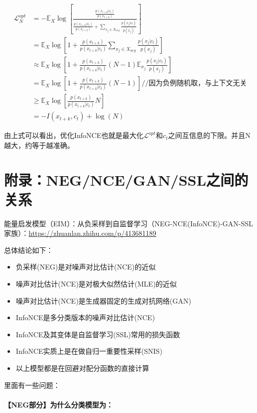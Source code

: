 \documentclass{article}
\begin{document}
\begin{equation}
    \begin{split}
        \mathcal{L}_N^{opt} &= - \mathbb{E}_{X} \log [\frac{\frac{p(x_{t+k}|c_t)}{p(x_{t+k})}}{\frac{p(x_{t+k}|c_t)}{p(x_{t+k})} + \sum_{x_j \in X_{neg}} \frac{p(x_j|c_t)}{p(x_j)} }] \\
        &= \mathbb{E}_{X} \log [1+ \frac{p(x_{t+k})}{p(x_{t+k}|c_t)} \sum_{x_j \in X_{neg}} \frac{p(x_j|c_t)}{p(x_j)}] \\
        &\approx \mathbb{E}_X \log [1+ \frac{p(x_{t+k})}{p(x_{t+k}|c_t)} (N-1) \mathbb{E}_{x_j}\frac{p(x_j|c_t)}{p(x_j)}] \\
        &=  \mathbb{E}_X \log [1+ \frac{p(x_{t+k})}{p(x_{t+k}|c_t)} (N-1)] // \textbf{因为负例随机取，与上下文无关}\\
        &\ge \mathbb{E}_X \log [\frac{p(x_{t+k})}{p(x_{t+k}|c_t)} N]\\
        &= -I(x_{t+k},c_t)+ \log(N)
    \end{split}
\end{equation}

由上式可以看出，优化InfoNCE也就是最大化$\mathcal{L}^{opt}$和$c_t$之间互信息的下限。并且N越大，约等于越准确。

\section{附录：NEG/NCE/GAN/SSL之间的关系}

能量启发模型（EIM）：从负采样到自监督学习（NEG-NCE(InfoNCE)-GAN-SSL 家族）：\url{https://zhuanlan.zhihu.com/p/413681189}


总体结论如下：
\begin{itemize}
    \item 负采样(NEG)是对噪声对比估计(NCE)的近似
    \item 噪声对比估计(NCE)是对极大似然估计(MLE)的近似
    \item 噪声对比估计(NCE)是生成器固定的生成对抗网络(GAN)
    \item InfoNCE是多分类版本的噪声对比估计(NCE)
    \item InfoNCE及其变体是自监督学习(SSL)常用的损失函数
    \item InfoNCE实质上是在做自归一重要性采样(SNIS)
    \item 以上模型都是在回避对配分函数的直接计算
\end{itemize}

里面有一些问题：

\paragraph{【NEG部分】为什么分类模型为：}
\end{document}
